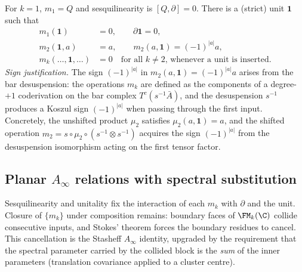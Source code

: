 \begin{definition}
For $k=1$, $m_1=Q$ and sesquilinearity is $[Q,\partial]=0$.
There is a (strict) unit $\mathbf 1$ such that
\begin{align}
\label{eq:unit-axioms}
m_1(\mathbf 1)&=0,\qquad \partial\mathbf 1=0,\\
\label{eq:unit-m2}
m_2(\mathbf 1,a)&=a,\qquad m_2(a,\mathbf 1)=(-1)^{|a|}a,\\
\label{eq:unit-higher}
m_k(\ldots,\mathbf 1,\ldots)&=0\quad \text{for all $k\neq 2$, whenever a unit is inserted}.
\end{align}
\noindent
\emph{Sign justification.}\; The sign $(-1)^{|a|}$ in
$m_2(a,\mathbf{1})=(-1)^{|a|}a$ arises from the bar desuspension: the
operations $m_k$ are defined as the components of a degree-$+1$
coderivation on the bar complex $T^c(s^{-1}\bar A)$, and the
desuspension $s^{-1}$ produces a Koszul sign $(-1)^{|a|}$ when
passing through the first input. Concretely, the unshifted product
$\mu_2$ satisfies $\mu_2(a,\mathbf{1}) = a$, and the shifted operation
$m_2 = s \circ \mu_2 \circ (s^{-1} \otimes s^{-1})$ acquires the
sign $(-1)^{|a|}$ from the desuspension isomorphism acting on the
first tensor factor.
\end{definition}

\subsection{Planar $A_\infty$ relations with spectral substitution}
\label{subsec:ainfty-relations}

Sesquilinearity and unitality fix the interaction of each $m_k$ with $\partial$ and the unit. Closure of $\{m_k\}$ under composition remains: boundary faces of $\FM_k(\C)$ collide consecutive inputs, and Stokes' theorem forces the boundary residues to cancel. This cancellation is the Stasheff $A_\infty$ identity, upgraded by the requirement that the spectral parameter carried by the collided block is the \emph{sum} of the inner parameters (translation covariance applied to a cluster centre).

